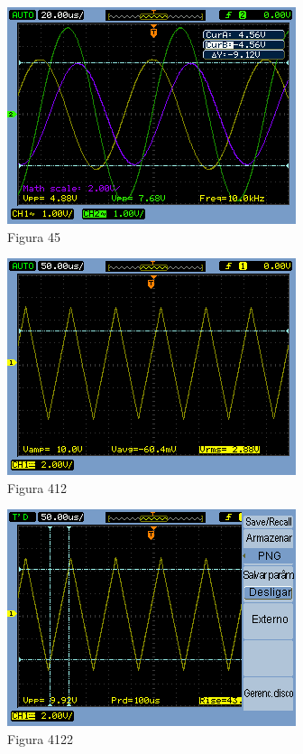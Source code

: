 \documentclass[a4paper]{article} %
\begin{document}
\begin{figure}
\begin{centering}
\includegraphics{Imagens/45}\caption{Figura 45 \label{fig:Fig-45}}
\par\end{centering}
\end{figure}

\begin{figure}
\begin{centering}
\includegraphics{Imagens/412}\caption{Figura 412 \label{fig:Fig-412}}
\par\end{centering}
\end{figure}

\begin{figure}
\begin{centering}
\includegraphics{Imagens/4122}\caption{Figura 4122 \label{fig:Fig-4122}}
\par\end{centering}
\end{figure}
\end{document}
